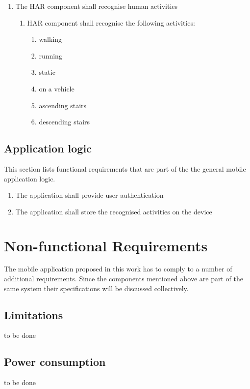     \begin{enumerate}
        \item The HAR component shall recognise human activities
        \begin{enumerate}
            \item HAR component shall recognise the following activities:
            \begin{enumerate}
                \item walking
                \item running
                \item static
                \item on a vehicle
                \item ascending stairs
                \item descending stairs
            \end{enumerate}
        \end{enumerate}
    \end{enumerate}
    
    \subsection{Application logic}
    This section lists functional requirements that are part of the the general mobile application logic.
    \begin{enumerate}
        \item The application shall provide user authentication
        \item The application shall store the recognised activities on the device
    \end{enumerate}

\section{Non-functional Requirements}
The mobile application proposed in this work has to comply to a number of additional requirements. Since the components mentioned above are part of the same system their specifications will be discussed collectively.

    \subsection{Limitations}
    to be done
    
    \subsection{Power consumption}
    to be done 
    
    
    